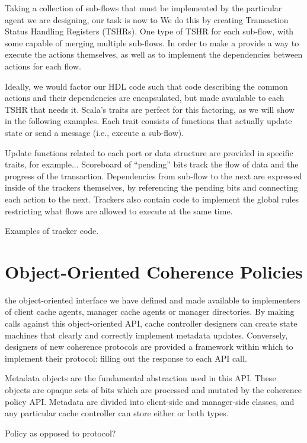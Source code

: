 Taking a collection of sub-flows that must be implemented by the particular agent we are designing,
our task is now to 
We do this by creating Transaction Status Handling Registers (TSHRs).
One type of TSHR for each sub-flow, with some capable of merging multiple sub-flows.
In order to make a
provide a way to execute the actions themselves, as well as to implement the dependencies between actions for each flow.

Ideally, we would factor our HDL code such that code describing the common actions and their dependencies are encapsulated,
but made avaulable to each TSHR that needs it.
Scala's traits are perfect for this factoring, as we will show in the following examples.
Each trait consists of functions that actually update state or send a message (i.e., execute a sub-flow).

Update functions related to each port or data structure are provided in specific traits, for example...
Scoreboard of ``pending'' bits track the flow of data and the progress of the transaction.
Dependencies from sub-flow to the next are expressed inside of the trackers themselves,
by referencing the pending bits and connecting each action to the next.
Trackers also contain code to implement the global rules restricting what flows are allowed to execute at the same time.

Examples of tracker code.


\section{Object-Oriented Coherence Policies}

the object-oriented interface
we have defined and made available to implementers of client cache agents, manager cache agents or manager directories. 
By making calls against this object-oriented API, cache controller designers can
create state machines that clearly and correctly implement metadata updates. 
Conversely, designers of new coherence protocols are provided a framework
within which to implement their protocol: filling out the response to each API call.

Metadata objects are the fundamental abstraction used in this API.
These objects are opaque sets of bits which are processed and mutated by the coherence policy API.
Metadata are divided into client-side and manager-side classes,
and any particular cache controller can store either or both types.

Policy as opposed to protocol?

